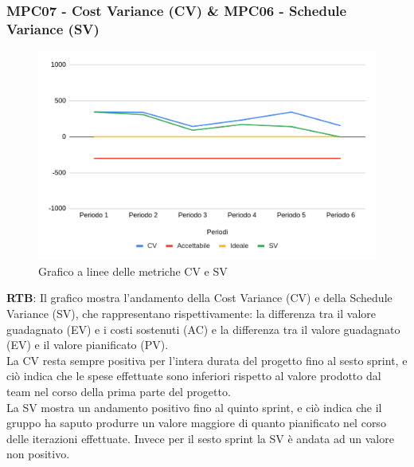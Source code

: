 \documentclass[10pt]{article}
\begin{document}
\begin{justify}
\subsubsection{MPC07 - Cost Variance (CV) \& MPC06 - Schedule Variance (SV)}

\begin{figure}[H]
  \centering
  \includegraphics[width=0.9\linewidth]{CV-SV.png}
  \caption{Grafico a linee delle metriche CV e SV}
  \label{fig:CV-SVchart}
\end{figure}

\textbf{RTB}: Il grafico mostra l'andamento  della Cost Variance (CV) e della Schedule Variance (SV), che rappresentano rispettivamente: 
la differenza tra il valore guadagnato (EV) e i costi sostenuti (AC) e la differenza tra il valore guadagnato (EV) e il valore pianificato (PV).\\
La CV resta sempre positiva per l'intera durata del progetto fino al sesto sprint, e ciò indica che le spese effettuate sono inferiori rispetto al valore prodotto
dal team nel corso della prima parte del progetto.\\
La SV mostra un andamento positivo fino al quinto sprint, e ciò indica che il gruppo ha saputo produrre un valore maggiore di quanto
pianificato nel corso delle iterazioni effettuate. Invece per il sesto sprint la SV è andata ad un valore non positivo.\\



\end{justify}
\end{document}
